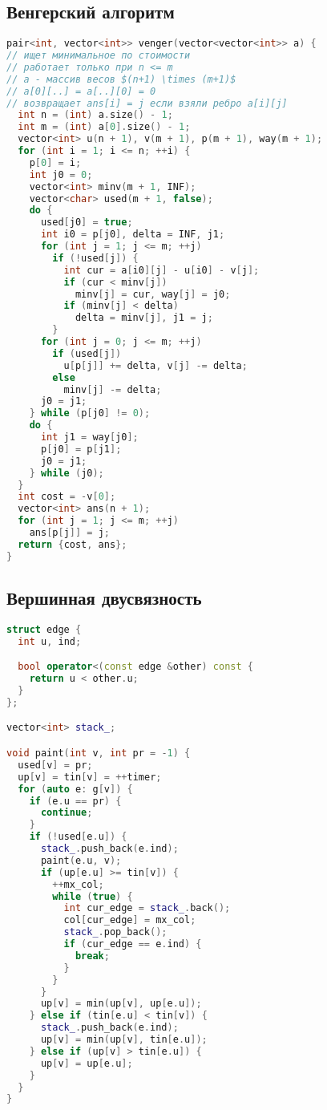 \documentclass[10pt,a4paper,landscape,twosided]{extarticle}
\begin{document}
\begin{multicols*}{3}
\subsection{Венгерский алгоритм}
\begin{lstlisting}[language=C++]
pair<int, vector<int>> venger(vector<vector<int>> a) {
// ищет минимальное по стоимости
// работает только при n <= m
// a - массив весов $(n+1) \times (m+1)$
// a[0][..] = a[..][0] = 0
// возвращает ans[i] = j если взяли ребро a[i][j]
  int n = (int) a.size() - 1;
  int m = (int) a[0].size() - 1;
  vector<int> u(n + 1), v(m + 1), p(m + 1), way(m + 1);
  for (int i = 1; i <= n; ++i) {
    p[0] = i;
    int j0 = 0;
    vector<int> minv(m + 1, INF);
    vector<char> used(m + 1, false);
    do {
      used[j0] = true;
      int i0 = p[j0], delta = INF, j1;
      for (int j = 1; j <= m; ++j)
        if (!used[j]) {
          int cur = a[i0][j] - u[i0] - v[j];
          if (cur < minv[j])
            minv[j] = cur, way[j] = j0;
          if (minv[j] < delta)
            delta = minv[j], j1 = j;
        }
      for (int j = 0; j <= m; ++j)
        if (used[j])
          u[p[j]] += delta, v[j] -= delta;
        else
          minv[j] -= delta;
      j0 = j1;
    } while (p[j0] != 0);
    do {
      int j1 = way[j0];
      p[j0] = p[j1];
      j0 = j1;
    } while (j0);
  }
  int cost = -v[0];
  vector<int> ans(n + 1);
  for (int j = 1; j <= m; ++j)
    ans[p[j]] = j;
  return {cost, ans};
}
\end{lstlisting}

\subsection{Вершинная двусвязность}
\begin{lstlisting}[language=C++]
struct edge {
  int u, ind;

  bool operator<(const edge &other) const {
    return u < other.u;
  }
};

vector<int> stack_;

void paint(int v, int pr = -1) {
  used[v] = pr;
  up[v] = tin[v] = ++timer;
  for (auto e: g[v]) {
    if (e.u == pr) {
      continue;
    }
    if (!used[e.u]) {
      stack_.push_back(e.ind);
      paint(e.u, v);
      if (up[e.u] >= tin[v]) {
        ++mx_col;
        while (true) {
          int cur_edge = stack_.back();
          col[cur_edge] = mx_col;
          stack_.pop_back();
          if (cur_edge == e.ind) {
            break;
          }
        }
      }
      up[v] = min(up[v], up[e.u]);
    } else if (tin[e.u] < tin[v]) {
      stack_.push_back(e.ind);
      up[v] = min(up[v], tin[e.u]);
    } else if (up[v] > tin[e.u]) {
      up[v] = up[e.u];
    }
  }
}


\end{lstlisting}
\end{multicols*}
\end{document}
